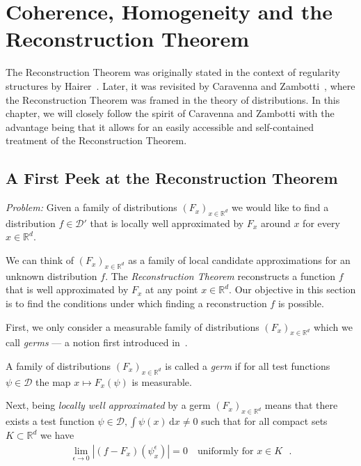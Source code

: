 \chapter{Coherence, Homogeneity and the Reconstruction Theorem}\label{chapter:reconstruction}

The Reconstruction Theorem was originally stated in the context of regularity structures by Hairer~\cite{hairer2014theory}. Later, it was revisited by Caravenna and Zambotti~\cite{caravenna2021hairer}, where the Reconstruction Theorem was framed in the theory of distributions. In this chapter, we will closely follow the spirit of Caravenna and Zambotti with the advantage being that it allows for an easily accessible and self-contained treatment of the Reconstruction Theorem.

\section{A First Peek at the Reconstruction Theorem}\label{chapter:first-peek-at-reconstruction}

\emph{Problem:} Given a family of distributions \({(F_x)}_{x \in \mathbb{R}^d}\) we would like to find a distribution \(f \in \mathcal{D'}\) that is locally well approximated by \(F_x\) around \(x\) for every \(x \in \mathbb{R}^d\). 

\vspace{0.5cm}

We can think of \({(F_x)}_{x \in \mathbb{R}^d}\) as a family of local candidate approximations for an unknown distribution \(f\). The \emph{Reconstruction Theorem} reconstructs a function \(f\) that is well approximated by \(F_x\) at any point \(x \in \mathbb{R}^d\). Our objective in this section is to find the conditions under which finding a reconstruction \(f\) is possible. 

First, we only consider a measurable family of distributions \({(F_x)}_{x \in \mathbb{R}^d}\) which we call \emph{germs} --- a notion first introduced in~\cite{caravenna2021hairer}.

\begin{definition}[Germ]
    A family of distributions \({(F_x)}_{x \in \mathbb{R}^d}\) is called a \emph{germ} if for all test functions \(\psi \in \mathcal{D}\) the map \(x \mapsto F_x(\psi)\) is measurable.
\end{definition}

Next, being \emph{locally well approximated} by a germ \({(F_x)}_{x \in \mathbb{R}^d}\) means that there exists a test function \(\psi \in \mathcal{D}, \int \psi(x)\, \mathrm{d}x \neq 0\) such that for all compact sets \(K \subset \mathbb{R}^d\) we have 
\begin{align}\label{peek:well-approximated}
    \lim_{\epsilon \to 0} |(f - F_x)(\psi^\epsilon_x)| = 0 \quad \text{uniformly for \(x \in K\) }.
\end{align} 

